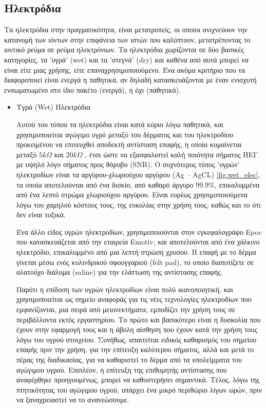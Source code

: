 \documentclass[11pt,a4paper,english,greek,twoside]{../Thesis}
\begin{document}
\subsection{Ηλεκτρόδια}
  \par Tα ηλεκτρόδια στην πραγματικότητα, είναι μετατροπείς, οι οποίοι ανιχνεύουν την κατανομή των ιόντων στην επιφάνεια των ιστών που καλύπτουν, μετατρέποντας το ιοντικό ρεύμα σε ρεύμα ηλεκτρόνιων. Τα ηλεκτρόδια χωρίζονται σε δύο βασικές κατηγορίες, τα 'υγρά' (wet) και τα 'στεγνά' (dry) και καθένα από αυτά μπορεί να είναι είτε μιας χρήσης, είτε επαναχρησιμοποιούμενο. Ένα ακόμα κριτήριο που τα διαφοροποιεί είναι ενεργά η παθητικά, αν δηλαδή κατασκευάζονται με έναν ενισχυτή ενσωματωμένο στο ίδιο πακέτο (ενεργά), η όχι (παθητικά).
\begin{itemize}
    \item{Υγρά (Wet) Ηλεκτρόδια}
    \par Αυτού του τύπου τα ηλεκτρόδια είναι κατά κύριο λόγω παθητικά, και χρησιμοποιείται αγώγιμο υγρό μεταξύ του δέρματος και του ηλεκτροδίου προκειμένου να επιτευχθεί αποδεκτή αντίσταση επαφής, η οποία κυμαίνεται μεταξύ $5kΩ$ και $20kΩ$ \cite{Nunez2006-li}, έτσι ώστε να εξασφαλιστεί καλή ποιότητα σήματος ΗΕΓ με υψηλό λόγο σήματος προς θόρυβο (SNR). Ο συχνότερος τύπος 'υγρών' ηλεκτροδίων είναι τα αργύρου-χλωριούχου αργύρου (Ag – AgCL) \ref{fig:wet_elec}, τα οποία αποτελούνται από ένα δισκίο, από καθαρό άργυρο $99.9\% $, επικαλυμμένα από ένα λεπτό στρώμα χλωριούχου αργύρου. Είναι ευρέως χρησιμοποιούμενα λόγω του χαμηλού κόστους τους, της ευκολίας στην χρήση τους, καθώς και το ότι δεν είναι τοξικά.  
    \par Ένα άλλο είδος υγρών ηλεκτροδίων, χρησιμοποιούνται στον εγκεφαλογράφο Epoc που κατασκευάζεται από την εταιρεία Emotiv, και αποτελούνται από ένα χάλκινο ηλεκτρόδιο, επικαλυμμένο από μια λεπτή στρώση χρυσού. Η επαφή με το δέρμα γίνεται μέσω ενός κυλινδρικού σφουγγαριού (felt pad), το οποίο διαποτίζετε σε αλατούχο διάλυμα (saline) για την ελάττωση της αντίστασης επαφής.
    \par Παρότι η επίδοση των υγρών ηλεκτροδίων είναι πολύ ικανοποιητική, και χρησιμοποιείται ως σημείο αναφοράς για τις νέες τεχνολογίες ηλεκτροδίων που εμφανίζονται, μια σειρά από μειονεκτήματα, εμποδίζει την χρήση τους σε περιβάλλοντα εκτός εργαστηρίου. Το πρώτο και βασικότερο είναι η δυσκολία που έχουν στην εφαρμογή τους και η άβολη αίσθηση που έχουν κατά την χρήση τους λόγω του υγρού στοιχείου. Συνήθως, απαιτείται ειδικός καθαρισμός  του σημείου επαφής πριν την χρήση, για την επίτευξη καλύτερου σήματος, αλλά και μετά το πέρας της διαδικασίας, για να καθαριστεί το δέρμα από  τα υπολείμματα του αγώγιμου υγρού. Επιπλέον, η επίτευξη της επιθυμητής αντίστασης που αναφέρθηκε προηγουμένως, μπορεί να καθυστερήσει σημαντικά. Τέλος, λόγω της πτητικότητας του αγώγιμου υγρού, υπάρχει ένα μικρό περιθώριο λίγων ωρών, πριν να ξαναχρειαστεί να το ανανεώσουμε.
    

\end{itemize}
\end{document}
